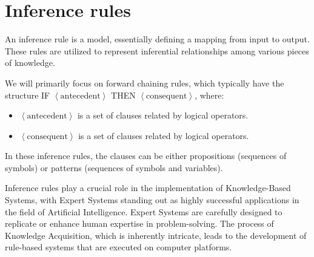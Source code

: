 \section{Inference rules}

\begin{definition}
    An inference rule is a model, essentially defining a mapping from input to output. 
    These rules are utilized to represent inferential relationships among various pieces of knowledge.
\end{definition}
We will primarily focus on forward chaining rules, which typically have the structure IF $\left\langle \text{antecedent} \right\rangle$ THEN $\left\langle \text{consequent} \right\rangle$, where: 
\begin{itemize}
    \item $\left\langle \text{antecedent} \right\rangle$ is a set of clauses related by logical operators.
    \item $\left\langle \text{consequent} \right\rangle$ is a set of clauses related by logical operators.
\end{itemize}
In these inference rules, the clauses can be either propositions (sequences of symbols) or patterns (sequences of symbols and variables).

Inference rules play a crucial role in the implementation of Knowledge-Based Systems, with Expert Systems standing out as highly successful applications in the field of Artificial Intelligence. 
Expert Systems are carefully designed to replicate or enhance human expertise in problem-solving. 
The process of Knowledge Acquisition, which is inherently intricate, leads to the development of rule-based systems that are executed on computer platforms.

